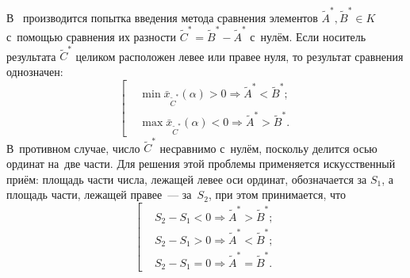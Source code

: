 В~\cite{Vorontsov_Compare} производится попытка введения метода сравнения элементов $\tilde A^{*}, \tilde B^{*} \in K$ с~помощью сравнения их разности $\tilde C^{*} = \tilde B^{*}-\tilde A^{*}$ с~нулём. Если носитель результата $\tilde C^{*}$ целиком расположен левее или правее нуля, то результат сравнения однозначен:
\begin{equation*}
  \left[ \begin{aligned}
     & \mathop{\min}{\bar x_{\tilde C^{*}} \left(\alpha \right)} > 0 \Rightarrow \tilde A^{*} < \tilde B^{*}; \\
     & \mathop{\max}{\bar x_{\tilde C^{*}} \left(\alpha \right)} < 0 \Rightarrow \tilde A^{*} > \tilde B^{*}.
  \end{aligned} \right.
\end{equation*}
В~противном случае, число $\tilde C^{*}$ несравнимо с~нулём, поскольу делится осью ординат на~две части. Для решения этой проблемы применяется искусственный приём: площадь части числа, лежащей левее оси ординат, обозначается за $S_1$, а площадь части, лежащей правее~--- за~$S_2$, при этом принимается, что
\begin{equation*}
  \left[ \begin{aligned}
    & S_2-S_1 < 0 \Rightarrow \tilde A^{*} > \tilde B^{*}; \\
    & S_2-S_1 > 0 \Rightarrow \tilde A^{*} < \tilde B^{*}; \\
    & S_2-S_1 = 0 \Rightarrow \tilde A^{*} = \tilde B^{*}.
  \end{aligned} \right.
\end{equation*}

